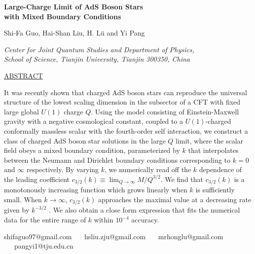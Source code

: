 \documentclass[11pt]{article}
\newcommand{\hoch}[1]{$\, ^{#1}$}
\begin{document}
\begin{center}
{\Large {\bf Large-Charge Limit of AdS Boson Stars \\ with Mixed Boundary Conditions}}

\vspace{20pt}

{\large Shi-Fa Guo, Hai-Shan Liu, H. L\"u and Yi Pang}

\vspace{10pt}

{\it  Center for Joint Quantum Studies and Department of Physics,\\
School of Science, Tianjin University, Tianjin 300350, China}

\vspace{40pt}

\underline{ABSTRACT}
\end{center}

It was recently shown that charged AdS boson stars can reproduce the universal structure of the lowest scaling dimension in the subsector of a CFT with fixed large global $U(1)$ charge $Q$. Using the model consisting of Einstein-Maxwell gravity with a negative cosmological constant, coupled to a $U(1)$-charged conformally massless scalar with the fourth-order self interaction, we construct a class of charged AdS boson star solutions in the large $Q$ limit, where the scalar field obeys a mixed boundary condition, parameterized by $k$ that interpolates between the Neumann and Dirichlet boundary conditions corresponding to $k=0$ and $\infty$ respectively. By varying $k$, we numerically read off the $k$ dependence of the leading coefficient $c_{3/2}(k) \equiv \lim_{Q\rightarrow \infty} M/Q^{3/2}$.  We find that $c_{3/2}(k)$ is a monotonously increasing function which grows linearly when $k$ is sufficiently small. When $k\rightarrow \infty$, $c_{3/2}(k)$ approaches the maximal value at a decreasing rate given by $k^{-3/2}$ . We also obtain a close form expression that fits the numerical data for the entire range of $k$ within $10^{-4}$ accuracy.





\vfill{\footnotesize shifaguo97@gmail.com \ \ \  hsliu.zju@gmail.com \ \ \ mrhonglu@gmail.com \ \ \ pangyi1@tju.edu.cn }


\thispagestyle{empty}
\pagebreak
\end{document}
